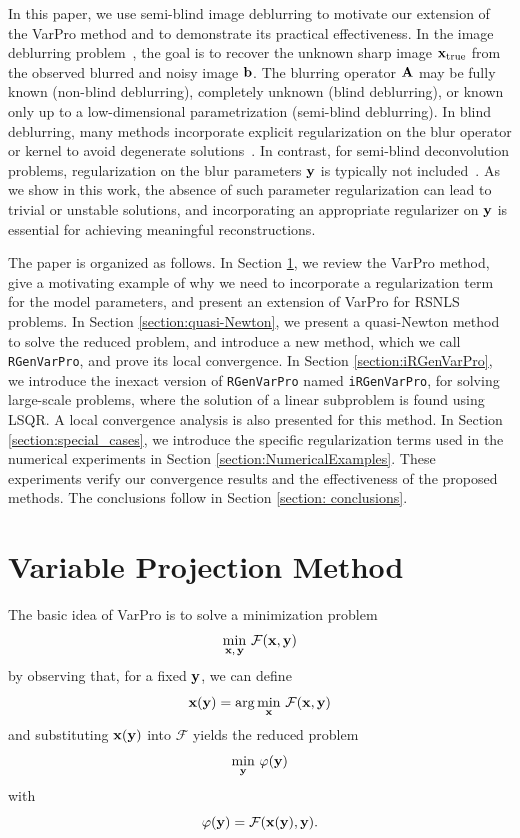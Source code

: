 \documentclass[onefignum,onetabnum]{siamart171218}
\newcommand{\bA}{{\bf A}}
\newcommand{\bb}{{\bf b}}
\newcommand{\bx}{{\bf x}}
\newcommand{\by}{{\bf y}}
\newcommand{\calF}{\mathcal{F}}
\begin{document}
In this paper, we use semi-blind image deblurring to motivate our extension of the VarPro method and to demonstrate its practical effectiveness. In the image deblurring problem~\cite{austin2022image, espanol2009multilevel, deblurring}, the goal is to recover the unknown sharp image $\bx_{\rm true}$ from the observed blurred and noisy image $\bb$. The blurring operator $\bA$ may be fully known (non-blind deblurring), completely unknown (blind deblurring), or known only up to a low-dimensional parametrization (semi-blind deblurring). In blind deblurring, many methods incorporate explicit regularization on the blur operator or kernel to avoid degenerate solutions~\cite{chan1998total, dykes2021lanczos, levin2009understanding}. In contrast, for semi-blind deconvolution problems, regularization on the blur parameters $\by$ is typically not included~\cite{buccini2018semiblind, chung2010efficient, cornelio2014constrained, espanol2025local, Espanol_2023, gazzola2021regularization}. As we show in this work, the absence of such parameter regularization can lead to trivial or unstable solutions, and incorporating an appropriate regularizer on $\by$ is essential for achieving meaningful reconstructions.

The paper is organized as follows. In Section \ref{sec:varpro}, we review the VarPro method, give a motivating example of why we need to incorporate a regularization term for the model parameters, and present an extension of VarPro for RSNLS problems. In Section \ref{section:quasi-Newton}, we present a quasi-Newton method to solve the reduced problem, and introduce a new method, which we call \texttt{RGenVarPro}, and prove its local convergence. In Section \ref{section:iRGenVarPro}, we introduce the inexact version of \texttt{RGenVarPro} named \texttt{iRGenVarPro}, for solving large-scale problems, where the solution of a linear subproblem is found using LSQR. A local convergence analysis is also presented for this method. In Section \ref{section:special_cases}, we introduce the specific regularization terms used in the numerical experiments in Section \ref{section:NumericalExamples}. These experiments verify our convergence results and the effectiveness of the proposed methods. The conclusions follow in %
Section \ref{section: conclusions}.

\section{Variable Projection Method}\label{sec:varpro}
The basic idea of VarPro is to solve a minimization problem %
$$\min_{\bx,\,\by}\,\calF(\bx,\by)$$
by observing that, for a fixed \(\by\), we can define
$$\bx(\by) = \arg\min_{\bx}\,\calF(\bx, \by)$$
and substituting $\bx(\by)$ into $\calF$ yields the reduced problem  
\begin{equation}\label{eq: minvarphi}
\min_{\by}\,\varphi(\by)
\end{equation}
 with $$\varphi(\by) = \calF(\bx(\by), \by).$$
 
\end{document}
